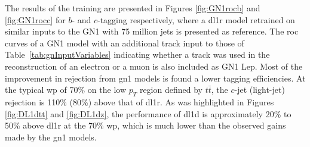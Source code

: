 The results of the training are presented in Figures \ref{fig:GN1rocb} and \ref{fig:GN1rocc} for $b$- and $c$-tagging respectively, where a \gls{dl1r} model retrained on similar inputs to the GN1 with 75 million jets is presented as reference. The \gls{roc} curves of a GN1 model with an additional track input to those of Table~\ref{tab:gnInputVariables} indicating whether a track was used in the reconstruction of an electron or a muon is also included as GN1 Lep. Most of the improvement in rejection from \gls{gn1} models is found a lower tagging efficiencies. At the typical \gls{wp} of 70\% on the low $p_T$ region defined by $t\bar{t}$, the $c$-jet (light-jet) rejection is 110\% (80\%) above that of \gls{dl1r}. As was highlighted in Figures \ref{fig:DL1dtt} and \ref{fig:DL1dz}, the performance of \gls{dl1d} is approximately 20\% to 50\% above \gls{dl1r} at the 70\% \gls{wp}, which is much lower than the observed gains made by the \gls{gn1} models.

